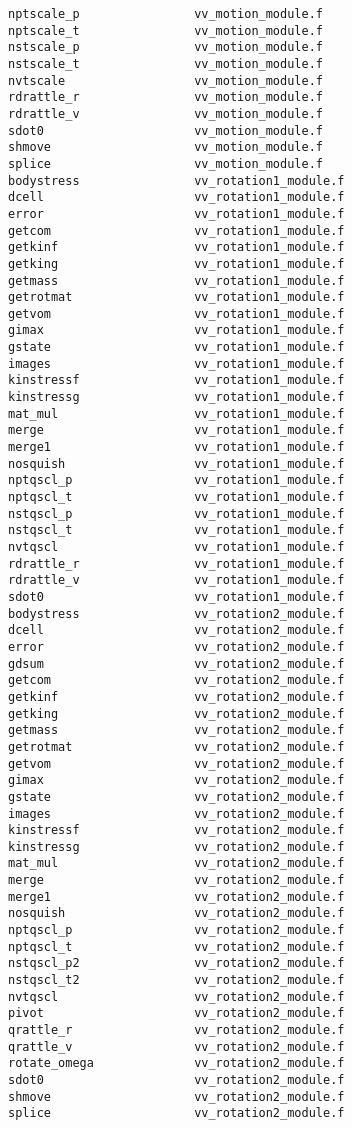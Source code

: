 \begin{verbatim}
nptscale_p                vv_motion_module.f
nptscale_t                vv_motion_module.f
nstscale_p                vv_motion_module.f
nstscale_t                vv_motion_module.f
nvtscale                  vv_motion_module.f
rdrattle_r                vv_motion_module.f
rdrattle_v                vv_motion_module.f
sdot0                     vv_motion_module.f
shmove                    vv_motion_module.f
splice                    vv_motion_module.f
bodystress                vv_rotation1_module.f
dcell                     vv_rotation1_module.f
error                     vv_rotation1_module.f
getcom                    vv_rotation1_module.f
getkinf                   vv_rotation1_module.f
getking                   vv_rotation1_module.f
getmass                   vv_rotation1_module.f
getrotmat                 vv_rotation1_module.f
getvom                    vv_rotation1_module.f
gimax                     vv_rotation1_module.f
gstate                    vv_rotation1_module.f
images                    vv_rotation1_module.f
kinstressf                vv_rotation1_module.f
kinstressg                vv_rotation1_module.f
mat_mul                   vv_rotation1_module.f
merge                     vv_rotation1_module.f
merge1                    vv_rotation1_module.f
nosquish                  vv_rotation1_module.f
nptqscl_p                 vv_rotation1_module.f
nptqscl_t                 vv_rotation1_module.f
nstqscl_p                 vv_rotation1_module.f
nstqscl_t                 vv_rotation1_module.f
nvtqscl                   vv_rotation1_module.f
rdrattle_r                vv_rotation1_module.f
rdrattle_v                vv_rotation1_module.f
sdot0                     vv_rotation1_module.f
bodystress                vv_rotation2_module.f
dcell                     vv_rotation2_module.f
error                     vv_rotation2_module.f
gdsum                     vv_rotation2_module.f
getcom                    vv_rotation2_module.f
getkinf                   vv_rotation2_module.f
getking                   vv_rotation2_module.f
getmass                   vv_rotation2_module.f
getrotmat                 vv_rotation2_module.f
getvom                    vv_rotation2_module.f
gimax                     vv_rotation2_module.f
gstate                    vv_rotation2_module.f
images                    vv_rotation2_module.f
kinstressf                vv_rotation2_module.f
kinstressg                vv_rotation2_module.f
mat_mul                   vv_rotation2_module.f
merge                     vv_rotation2_module.f
merge1                    vv_rotation2_module.f
nosquish                  vv_rotation2_module.f
nptqscl_p                 vv_rotation2_module.f
nptqscl_t                 vv_rotation2_module.f
nstqscl_p2                vv_rotation2_module.f
nstqscl_t2                vv_rotation2_module.f
nvtqscl                   vv_rotation2_module.f
pivot                     vv_rotation2_module.f
qrattle_r                 vv_rotation2_module.f
qrattle_v                 vv_rotation2_module.f
rotate_omega              vv_rotation2_module.f
sdot0                     vv_rotation2_module.f
shmove                    vv_rotation2_module.f
splice                    vv_rotation2_module.f
\end{verbatim}
